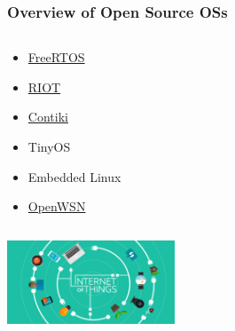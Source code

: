 \documentclass{beamer}
\begin{document}
\begin{frame}
	\frametitle{Overview of Open Source OSs}
	\begin{columns}[c]
		\begin{column}{30cm}
			\vspace{.1cm}
			\begin{itemize}
				\justifying
				\item \textcolor{blue}{\href{http://www.freertos.org}{FreeRTOS}}
				\item \textcolor{blue}{\href{http://www.riot-os.org}{RIOT}}
				\item \textcolor{blue}{\href{http://www.contiki-os.org}{Contiki}}
				\item TinyOS
				\item Embedded Linux
				\item \textcolor{blue}{\href{http://www.openwsn.org}{OpenWSN}}
			\end{itemize}
		\end{column}
	\end{columns}
	\vspace{.5cm}
	\hspace*{5.5cm} \includegraphics[width=5cm]{figs/Internet-of-Things-2.jpg}
\end{frame}
\end{document}

